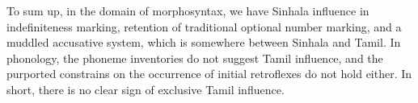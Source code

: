 To sum up, in the domain of morphosyntax, we have Sinhala influence in  indefiniteness marking, retention of traditional optional number marking, and a muddled accusative system, which is somewhere between Sinhala and Tamil. In phonology, the phoneme inventories do not suggest Tamil influence, and the purported constrains on the occurrence of initial retroflexes do not hold either. In short, there is no clear sign of exclusive Tamil influence.

\begin{table}
\end{table}
